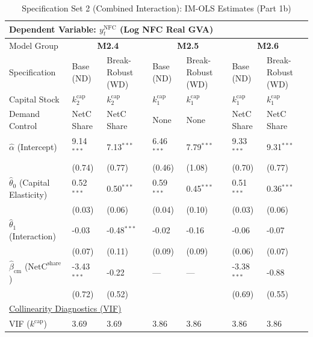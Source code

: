 \begin{table}[H]
\centering
\caption{Specification Set 2 (Combined Interaction): IM-OLS Estimates (Part 1b)}
\label{tab:spec_set_2_p1b}
\scriptsize
\begin{tabular}{p{3.8cm}p{2.1cm}p{2.1cm}p{2.1cm}p{2.1cm}p{2.1cm}p{2.1cm}}
\toprule
\multicolumn{7}{l}{\textbf{Dependent Variable: $y_t^{\text{NFC}}$ (Log NFC Real GVA)}} \\
\midrule
Model Group & \multicolumn{2}{c}{\textbf{M2.4}} & \multicolumn{2}{c}{\textbf{M2.5}} & \multicolumn{2}{c}{\textbf{M2.6}}  \\
Specification & Base (ND) & Break-Robust (WD) & Base (ND) & Break-Robust (WD) & Base (ND) & Break-Robust (WD)  \\
Capital Stock & $k^{\text{cap}}_2$ & $k^{\text{cap}}_2$ & $k^{\text{cap}}_1$ & $k^{\text{cap}}_1$ & $k^{\text{cap}}_1$ & $k^{\text{cap}}_1$  \\
Demand Control & NetC Share & NetC Share & None & None & NetC Share & NetC Share  \\
\midrule
$\hat{\alpha}$ (Intercept)  & 9.14$^{***}$ & 7.13$^{***}$ & 6.46$^{***}$ & 7.79$^{***}$ & 9.33$^{***}$ & 9.31$^{***}$  \\
 & {\scriptsize (0.74)} & {\scriptsize (0.77)} & {\scriptsize (0.46)} & {\scriptsize (1.08)} & {\scriptsize (0.70)} & {\scriptsize (0.77)}  \\
[1ex]
$\hat{\theta}_0$ (Capital Elasticity)  & 0.52$^{***}$ & 0.50$^{***}$ & 0.59$^{***}$ & 0.45$^{***}$ & 0.51$^{***}$ & 0.36$^{***}$  \\
 & {\scriptsize (0.03)} & {\scriptsize (0.06)} & {\scriptsize (0.04)} & {\scriptsize (0.10)} & {\scriptsize (0.03)} & {\scriptsize (0.06)}  \\
$\hat{\theta}_1$ (Interaction)  & -0.03 & -0.48$^{***}$ & -0.02 & -0.16 & -0.06 & -0.07  \\
 & {\scriptsize (0.07)} & {\scriptsize (0.11)} & {\scriptsize (0.09)} & {\scriptsize (0.09)} & {\scriptsize (0.06)} & {\scriptsize (0.07)}  \\
$\hat{\beta}_{\text{cm}}$ ($\text{NetC}^{\text{share}}$)  & -3.43$^{***}$ & -0.22 & --- & --- & -3.38$^{***}$ & -0.88  \\
 & {\scriptsize (0.72)} & {\scriptsize (0.52)} &  &  & {\scriptsize (0.69)} & {\scriptsize (0.55)}  \\
\midrule
\multicolumn{7}{l}{\underline{Collinearity Diagnostics (VIF)}} \\
VIF ($k^{\text{cap}}$) & 3.69 & 3.69 & 3.86 & 3.86 & 3.86 & 3.86  \\

\end{tabular}
\end{table}
